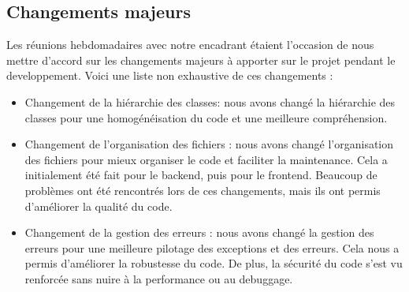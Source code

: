 \subsection{Changements majeurs}

Les réunions hebdomadaires avec notre encadrant étaient l'occasion de nous mettre d'accord sur
les changements majeurs à apporter sur le projet pendant le developpement. Voici une liste non exhaustive de ces changements :

\begin{itemize}
    \item Changement de la hiérarchie des classes: nous avons changé la hiérarchie des classes pour
    une homogénéisation du code et une meilleure compréhension.
    \item Changement de l'organisation des fichiers : nous avons changé l'organisation des fichiers pour
    mieux organiser le code et faciliter la maintenance. Cela a initialement été fait pour le backend, puis
    pour le frontend. Beaucoup de problèmes ont été rencontrés lors de ces changements, mais ils ont permis
    d'améliorer la qualité du code.
    \item Changement de la gestion des erreurs : nous avons changé la gestion des erreurs pour une meilleure
    pilotage des exceptions et des erreurs. Cela nous a permis d'améliorer la robustesse du code.
    De plus,  la sécurité du code s'est vu renforcée sans nuire à la performance ou au debuggage.
\end{itemize}

